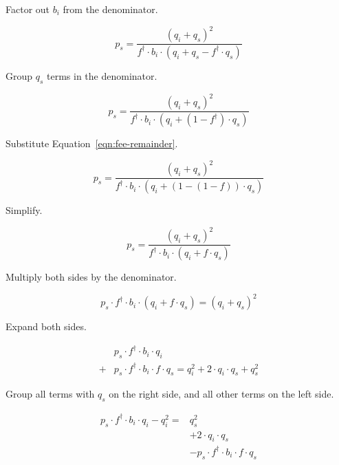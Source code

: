 Factor out $b_i$ from the denominator.

\begin{equation*}
	p_s = \frac{{(q_i + q_s)}^2}{f^{\dagger} \cdot b_i \cdot
		\left(q_i + q_s - f^{\dagger} \cdot q_s\right)}
\end{equation*}

Group $q_s$ terms in the denominator.

\begin{equation*}
	p_s = \frac{{(q_i + q_s)}^2}{f^{\dagger} \cdot b_i \cdot
		\left(q_i + (1 - f^{\dagger}) \cdot q_s \right)}
\end{equation*}

Substitute Equation~\ref{eqn:fee-remainder}.

\begin{equation*}
	p_s = \frac{{(q_i + q_s)}^2}{f^{\dagger} \cdot b_i \cdot
		\left(q_i + (1 - (1 - f)) \cdot q_s \right)}
\end{equation*}

Simplify.

\begin{equation*}
	p_s = \frac{{(q_i + q_s)}^2}{f^{\dagger} \cdot b_i \cdot
		\left(q_i + f \cdot q_s \right)}
\end{equation*}

Multiply both sides by the denominator.

\begin{equation*}
	p_s \cdot f^{\dagger} \cdot b_i \cdot (q_i + f \cdot q_s) = {(q_i + q_s)}^2
\end{equation*}

Expand both sides.

\begin{equation}
	\begin{aligned}
		      & p_s \cdot f^{\dagger} \cdot b_i \cdot q_i           \\
		{}+{} & p_s \cdot f^{\dagger} \cdot b_i \cdot f \cdot q_s =
		q_i^2 + 2 \cdot q_i \cdot q_s + q_s^2
	\end{aligned} \nonumber
\end{equation}

Group all terms with $q_s$ on the right side, and all other terms on the left side.

\begin{equation*}
	\begin{aligned}
		p_s \cdot f^{\dagger} \cdot b_i \cdot q_i - q_i^ 2 ={}
		 & q_s^2                                               \\
		 & + 2 \cdot q_i \cdot q_s                             \\
		 & - p_s \cdot f^{\dagger} \cdot b_i \cdot f \cdot q_s
	\end{aligned}
\end{equation*}

